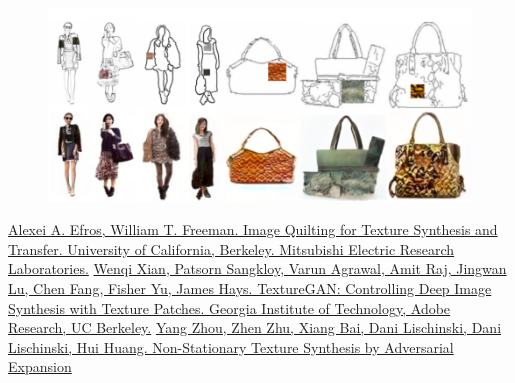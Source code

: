 \documentclass[12pt,a4paper]{report}
\begin{document}
\begin{figure}[H]
  \centering
  \includegraphics[scale = 0.33]{pics/examples.png}
\end{figure}


\begin{thebibliography}{99}
 \href{https://people.eecs.berkeley.edu/~efros/research/quilting/quilting.pdf}{Alexei A. Efros, William T. Freeman. Image Quilting for Texture Synthesis and Transfer. University of California, Berkeley. Mitsubishi Electric Research Laboratories.}
 \href{https://arxiv.org/pdf/1706.02823v3.pdf}{Wenqi Xian, Patsorn Sangkloy, Varun Agrawal, Amit Raj, Jingwan Lu, Chen Fang, Fisher Yu, James Hays. TextureGAN: Controlling Deep Image Synthesis with Texture Patches. Georgia Institute of Technology, Adobe Research, UC Berkeley.}
 \href{https://arxiv.org/pdf/1805.04487v1.pdf}{Yang Zhou, Zhen Zhu, Xiang Bai, Dani Lischinski, Dani Lischinski, Hui Huang. Non-Stationary Texture Synthesis by Adversarial Expansion}
\end{thebibliography}
\end{document}
